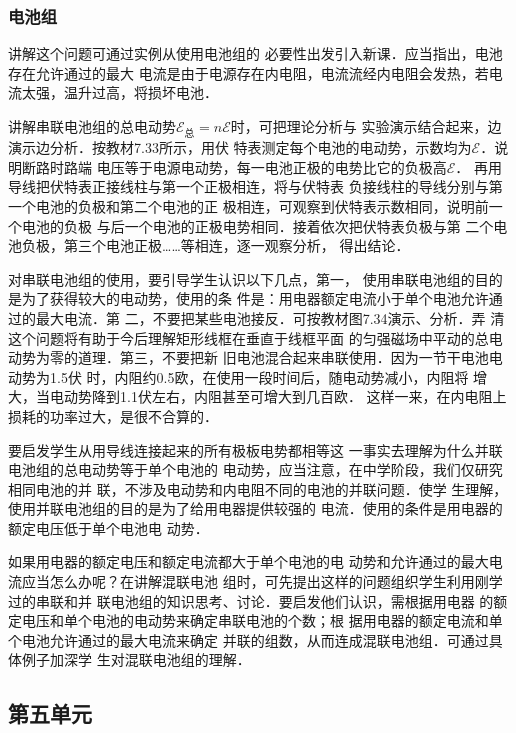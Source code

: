 \subsubsection{电池组}

讲解这个问题可通过实例从使用电池组的
必要性出发引入新课．应当指出，电池存在允许通过的最大
电流是由于电源存在内电阻，电流流经内电阻会发热，若电
流太强，温升过高，将损坏电池．

讲解串联电池组的总电动势$\mathcal{E}_{\text{总}}=n\mathcal{E}$时，可把理论分析与
实验演示结合起来，边演示边分析．按教材7.33所示，用伏
特表测定每个电池的电动势，示数均为$\mathcal{E}$．说明断路时路端
电压等于电源电动势，每一电池正极的电势比它的负极高$\mathcal{E}$．
再用导线把伏特表正接线柱与第一个正极相连，将与伏特表
负接线柱的导线分别与第一个电池的负极和第二个电池的正
极相连，可观察到伏特表示数相同，说明前一个电池的负极
与后一个电池的正极电势相同．接着依次把伏特表负极与第
二个电池负极，第三个电池正极……等相连，逐一观察分析，
得出结论．

对串联电池组的使用，要引导学生认识以下几点，第一，
使用串联电池组的目的是为了获得较大的电动势，使用的条
件是：用电器额定电流小于单个电池允许通过的最大电流．第
二，不要把某些电池接反．可按教材图7.34演示、分析．弄
清这个问题将有助于今后理解矩形线框在垂直于线框平面
的匀强磁场中平动的总电动势为零的道理．第三，不要把新
旧电池混合起来串联使用．因为一节干电池电动势为1.5伏
时，内阻约0.5欧，在使用一段时间后，随电动势减小，内阻将
增大，当电动势降到1.1伏左右，内阻甚至可增大到几百欧．
这样一来，在内电阻上损耗的功率过大，是很不合算的．

要启发学生从用导线连接起来的所有极板电势都相等这
一事实去理解为什么并联电池组的总电动势等于单个电池的
电动势，应当注意，在中学阶段，我们仅研究相同电池的并
联，不涉及电动势和内电阻不同的电池的并联问题．使学
生理解，使用并联电池组的目的是为了给用电器提供较强的
电流．使用的条件是用电器的额定电压低于单个电池电
动势．

如果用电器的额定电压和额定电流都大于单个电池的电
动势和允许通过的最大电流应当怎么办呢？在讲解混联电池
组时，可先提出这样的问题组织学生利用刚学过的串联和并
联电池组的知识思考、讨论．要启发他们认识，需根据用电器
的额定电压和单个电池的电动势来确定串联电池的个数；根
据用电器的额定电流和单个电池允许通过的最大电流来确定
并联的组数，从而连成混联电池组．可通过具体例子加深学
生对混联电池组的理解．

\subsection{第五单元}

